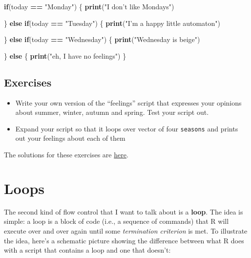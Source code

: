 \documentclass[]{book}
\newenvironment{Shaded}{\begin{snugshade}}{\end{snugshade}}
\newcommand{\ControlFlowTok}[1]{\textcolor[rgb]{0.13,0.29,0.53}{\textbf{#1}}}
\newcommand{\KeywordTok}[1]{\textcolor[rgb]{0.13,0.29,0.53}{\textbf{#1}}}
\newcommand{\NormalTok}[1]{#1}
\newcommand{\OperatorTok}[1]{\textcolor[rgb]{0.81,0.36,0.00}{\textbf{#1}}}
\newcommand{\StringTok}[1]{\textcolor[rgb]{0.31,0.60,0.02}{#1}}
\providecommand{\tightlist}{%
  \setlength{\itemsep}{0pt}\setlength{\parskip}{0pt}}
\begin{document}
\begin{Shaded}
\begin{Highlighting}[]
\ControlFlowTok{if}\NormalTok{(today }\OperatorTok{==}\StringTok{ "Monday"}\NormalTok{) \{}
  \KeywordTok{print}\NormalTok{(}\StringTok{"I don’t like Mondays"}\NormalTok{)}
  
\NormalTok{\} }\ControlFlowTok{else} \ControlFlowTok{if}\NormalTok{(today }\OperatorTok{==}\StringTok{ "Tuesday"}\NormalTok{) \{}
  \KeywordTok{print}\NormalTok{(}\StringTok{"I’m a happy little automaton"}\NormalTok{)}
  
\NormalTok{\} }\ControlFlowTok{else} \ControlFlowTok{if}\NormalTok{(today }\OperatorTok{==}\StringTok{ "Wednesday"}\NormalTok{) \{}
  \KeywordTok{print}\NormalTok{(}\StringTok{"Wednesday is beige"}\NormalTok{)}
  
\NormalTok{\} }\ControlFlowTok{else}\NormalTok{ \{}
  \KeywordTok{print}\NormalTok{(}\StringTok{"eh, I have no feelings"}\NormalTok{)}
\NormalTok{\}}
\end{Highlighting}
\end{Shaded}

\hypertarget{exercises-2}{%
\subsection{Exercises}\label{exercises-2}}

\begin{itemize}
\tightlist
\item
  Write your own version of the ``feelings'' script that expresses your opinions about summer, winter, autumn and spring. Test your script out.
\item
  Expand your script so that it loops over vector of four \texttt{seasons} and prints out your feelings about each of them
\end{itemize}

The solutions for these exercises are \href{./scripts/solutions_branch.R}{here}.

\hypertarget{loops}{%
\section{Loops}\label{loops}}

The second kind of flow control that I want to talk about is a \textbf{loop}. The idea is simple: a loop is a block of code (i.e., a sequence of commands) that R will execute over and over again until some \emph{termination criterion} is met. To illustrate the idea, here's a schematic picture showing the difference between what R does with a script that contains a loop and one that doesn't:
\end{document}
